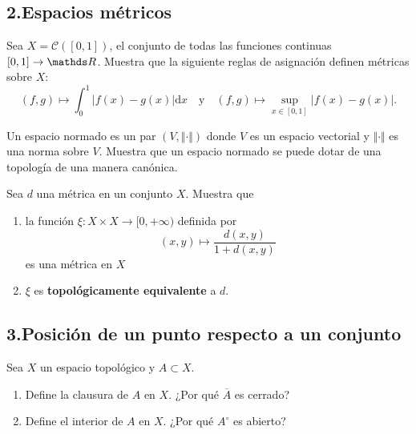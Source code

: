 \documentclass[b5paper,10pt,twoside]{book}
\begin{document}
\subsection*{2.\enspace Espacios métricos}

\begin{problem}
Sea \(X=\mathcal{C}([0,1])\), el conjunto de todas las funciones continuas \([0,1]\to \R\).
Muestra que la
siguiente reglas de asignación 
definen métricas sobre \(X\):
\[
(f,g) \mapsto \int_0^1 |f(x) - g(x)|\mathrm{d}x
\quad\text{y}\quad
(f,g) \mapsto \sup_{x\in[0,1]} |f(x) - g(x)|.
\]

\end{problem}
 

\begin{problem}
Un espacio normado es un par \((V, \Vert \cdot \Vert)\) donde \(V\) es un espacio vectorial y \(\Vert \cdot \Vert\) es una norma sobre \(V\).
Muestra que un espacio normado se puede dotar de una topología de una manera canónica.
\end{problem}


\begin{problem}
Sea $d$ una métrica en un conjunto $X$.
Muestra que
\begin{enumerate}[label=(\roman*)]
\item la función ${\xi} : X \times X \to [0, +\infty)$ definida por 
\[
(x, y) \mapsto \frac{d(x, y)}{1 + d(x, y)}
\]
es una métrica en $X$

\item \(\xi\) es \textbf{topológicamente equivalente} a \(d\).
\end{enumerate}
\end{problem}

\subsection*{3.\enspace Posición de un punto respecto  a un conjunto}

\begin{problem}
Sea \(X\) un espacio topológico y \(A\subset X\).
\begin{enumerate}[label=(\roman*)]
\item Define la clausura de \(A\) en \(X\). ¿Por qué \(\overline{A}\) es cerrado?
\item Define el interior  de \(A\) en \(X\).  ¿Por qué \({A}^\circ \) es abierto?
\end{enumerate}
\end{problem}
\end{document}
